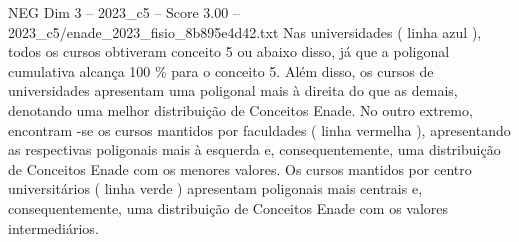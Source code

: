 \begin{textsample}{NEG Dim 3 – 2023\_c5 – Score 3.00 – 2023\_c5/enade\_2023\_fisio\_8b895e4d42.txt}
Nas universidades ( linha azul ), todos os cursos obtiveram conceito 5 ou abaixo disso, já que a poligonal cumulativa alcança 100 \% para o conceito 5.
Além disso, os cursos de universidades apresentam uma poligonal mais à direita do que as demais, denotando uma melhor distribuição de Conceitos Enade.
No outro extremo, encontram -se os cursos mantidos por faculdades ( linha vermelha ), apresentando as respectivas poligonais mais à esquerda e, consequentemente, uma distribuição de Conceitos Enade com os menores valores.
Os cursos mantidos por centro universitários ( linha verde ) apresentam poligonais mais centrais e, consequentemente, uma distribuição de Conceitos Enade com os valores intermediários.

\end{textsample}
